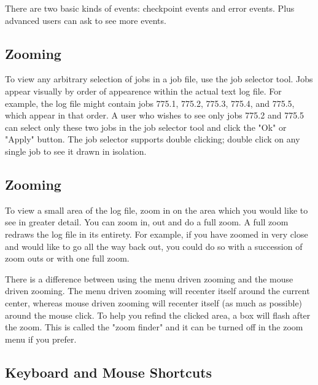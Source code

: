 There are two basic kinds of events: checkpoint events and error events.   Plus advanced users can ask to see more events. 


\subsection{\label{sec:job-selector}Zooming}

To view any arbitrary selection of jobs in a job file, use the job selector tool.  Jobs appear visually by order of appearence within the actual text log file.  For example, the log file might contain jobs
775.1, 775.2, 775.3, 775.4, and 775.5, which appear in that order.  A user who wishes to see only jobs 775.2 and 775.5 can select only these two jobs in the job selector tool and click the "Ok" or
"Apply" button.  The job selector supports double clicking; double
click on any single job to see it drawn in isolation. 

\subsection{\label{sec:zooming}Zooming}

To view a small area of the log file, zoom in on the area which you would like to see in greater detail. You can zoom in, out and do a full zoom. A full zoom redraws the log file in its entirety. For
example, if you have zoomed in very close and would like to go all the way back out, you could do so with a succession of zoom outs or with one full zoom. 

There is a difference between using the menu driven zooming and the mouse driven zooming. The menu driven zooming will recenter itself around the current center, whereas mouse driven
zooming will recenter itself (as much as possible) around the mouse click. To help you refind the clicked area, a box will flash after the zoom. This is called the "zoom finder" and it can be turned
off in the zoom menu if you prefer. 

\subsection{\label{sec:k-m-shortcuts}Keyboard and Mouse Shortcuts}

